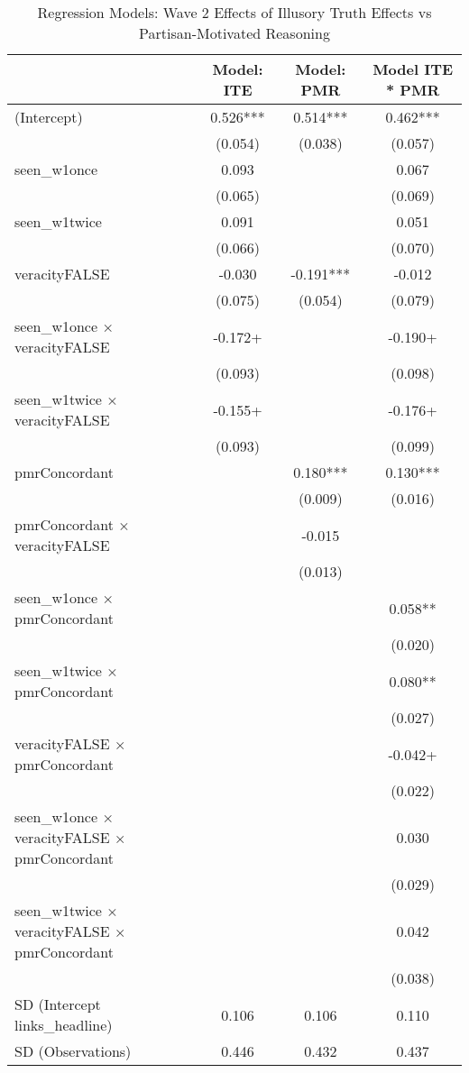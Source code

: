 \begin{table}

\caption{\label{table:main\_wave2}Regression Models: Wave 2 Effects of Illusory Truth Effects vs Partisan-Motivated Reasoning}
\centering
\begin{threeparttable}
\begin{tabular}[t]{lccc}
\toprule
  & Model: ITE & Model: PMR & Model ITE * PMR\\
\midrule
(Intercept) & 0.526*** & 0.514*** & 0.462***\\
 & (0.054) & (0.038) & (0.057)\\
seen\_w1once & 0.093 &  & 0.067\\
 & (0.065) &  & (0.069)\\
seen\_w1twice & 0.091 &  & 0.051\\
 & (0.066) &  & (0.070)\\
veracityFALSE & -0.030 & -0.191*** & -0.012\\
 & (0.075) & (0.054) & (0.079)\\
seen\_w1once × veracityFALSE & -0.172+ &  & -0.190+\\
 & (0.093) &  & (0.098)\\
seen\_w1twice × veracityFALSE & -0.155+ &  & -0.176+\\
 & (0.093) &  & (0.099)\\
pmrConcordant &  & 0.180*** & 0.130***\\
 &  & (0.009) & (0.016)\\
pmrConcordant × veracityFALSE &  & -0.015 & \\
 &  & (0.013) & \\
seen\_w1once × pmrConcordant &  &  & 0.058**\\
 &  &  & (0.020)\\
seen\_w1twice × pmrConcordant &  &  & 0.080**\\
 &  &  & (0.027)\\
veracityFALSE × pmrConcordant &  &  & -0.042+\\
 &  &  & (0.022)\\
seen\_w1once × veracityFALSE × pmrConcordant &  &  & 0.030\\
 &  &  & (0.029)\\
seen\_w1twice × veracityFALSE × pmrConcordant &  &  & 0.042\\
 &  &  & (0.038)\\
SD (Intercept links\_headline) & 0.106 & 0.106 & 0.110\\
SD (Observations) & 0.446 & 0.432 & 0.437\\

\end{tabular}
\end{threeparttable}
\end{table}
